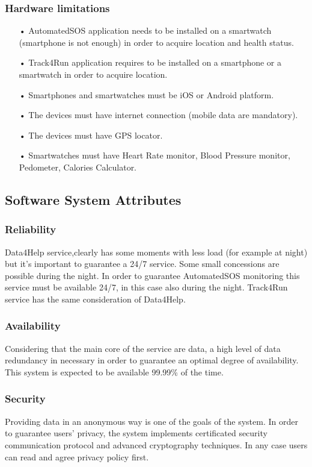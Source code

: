 \subsubsection{Hardware limitations}
\begin{enumerate} 
\item[•] AutomatedSOS application needs to be installed on a smartwatch (smartphone is not enough) in order to acquire location and health status.
\item[•] Track4Run application requires to be installed on a smartphone or a smartwatch in order to acquire location.
\item[•] Smartphones and smartwatches must be iOS or Android platform.
\item[•] The devices must have internet connection (mobile data are mandatory).
\item[•] The devices must have GPS locator.
\item[•] Smartwatches must have Heart Rate monitor, Blood Pressure monitor, Pedometer, Calories Calculator.
\end{enumerate}

\subsection{Software System Attributes}
\subsubsection{Reliability}
Data4Help service,clearly has some moments with less load (for example at night) but it's important to guarantee a 24/7 service. Some small concessions are possible during the night.
In order to guarantee AutomatedSOS monitoring this service must be available 24/7, in this case also during the night.
Track4Run service has the same consideration of Data4Help.
\subsubsection{Availability}
Considering that the main core of the service are data, a high level of data redundancy in necessary in order to guarantee an optimal degree of availability.
This system is expected to be available 99.99\% of the time. 
\subsubsection{Security}
Providing data in an anonymous way is one of the goals of the system. In order to guarantee users' privacy, the system implements certificated security communication protocol and advanced cryptography techniques.
In any case users can read and agree privacy policy first.
